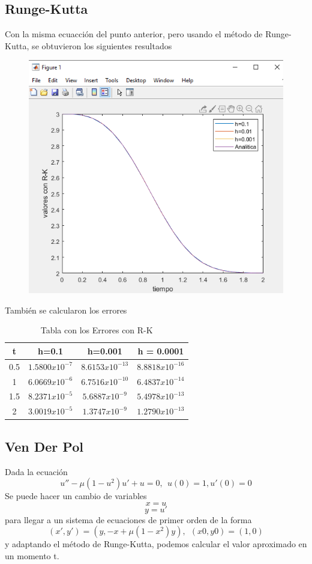 \documentclass[12pt]{article}
\begin{document}
\subsection{Runge-Kutta}
Con la misma ecuacción del punto anterior, pero usando el método de Runge-Kutta, se obtuvieron los siguientes resultados
\begin{figure}[h]
	\centering
	\caption{}
	\includegraphics[scale=0.45]{graf4.png}
	\label{graf4}
\end{figure}
\newpage
También se calcularon los errores
\begin{table}[h]
	\centering
	\begin{tabular}{|c|c|c|c|}
		\hline
		t & h=0.1 & h=0.001 & h = 0.0001 \\
		\hline
		0.5&$1.5800x10^{-7}$&$8.6153x10^{-13}$&$8.8818x10^{-16}$\\
		\hline
		1&$6.0669x10^{-6}$&$6.7516x10^{-10}$&$6.4837x10^{-14}$\\
		\hline
		1.5&$8.2371x10^{-5}$&$5.6887x10^{-9}$&$5.4978x10^{-13}$\\
		\hline
		2&$3.0019x10^{-5}$&$1.3747x10^{-9}$&$1.2790x10^{-13}$\\
		\hline
	\end{tabular}
	\caption{Tabla con los Errores con R-K}
	\label{table4}
\end{table}
\subsection{Ven Der Pol}
Dada la ecuación
\begin{equation}
	u''-\mu(1-u^2)u'+u=0,~~u(0)=1, u'(0)=0
	\label{Pol}
\end{equation}
Se puede hacer un cambio de variables $$x = u$$$$y = u'$$
para llegar a un sistema de ecuaciones de primer orden de la forma $$(x',y') = (y, -x+\mu(1-x^2)y),~~(x0,y0)=(1,0)$$ y adaptando el método de Runge-Kutta, podemos calcular el valor aproximado en un momento t.
\end{document}
